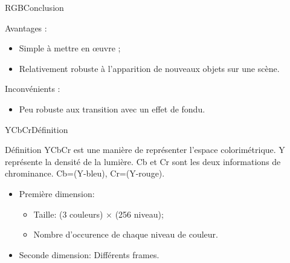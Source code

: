 \begin{frame}{RGB}{Conclusion}

\begin{block}{Avantages :}

\begin{itemize}
    \item Simple à mettre en œuvre ;
    \item Relativement robuste à l'apparition de nouveaux objets sur une scène.
\end{itemize}

\end{block}

\begin{block}{Inconvénients :}

\begin{itemize}
    \item Peu robuste aux transition avec un effet de fondu.
\end{itemize}

\end{block}

\end{frame}

\begin{frame}{YCbCr}{Définition}
\begin{block}{Définition}
YCbCr est une manière de représenter l'espace colorimétrique. Y représente la densité de la lumière. Cb et Cr sont les deux informations de chrominance. Cb=(Y-bleu), Cr=(Y-rouge).

\begin{itemize}
	\item Première dimension: 
		\begin{itemize}
			\item Taille: (3 couleurs) $\times$ (256 niveau);
			\item Nombre d'occurence de chaque niveau de couleur.
		\end{itemize}
	\item Seconde dimension: Différents frames.
\end{itemize}

\end{block}

\end{frame}

